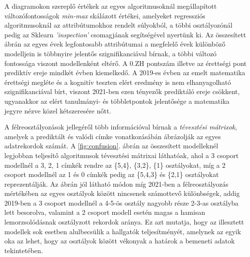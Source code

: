 \documentclass[12pt]{article}
\begin{document}
%	



\noindent A diagramokon szereplő értékek az egyes algoritmusoknál megállapított változófontosságok \textit{min-max} skálázott értékei, amelyeket regressziós algoritmusoknál az attribútumokhoz rendelt súlyokból, a többi osztályozónál pedig az Sklearn \textit{'inspection'} csomagjának segítségével nyertünk ki. Az összesített ábrán az egyes évek legfontosabb attribútumai a megfelelő évek különböző modelljein is többnyire jelentős szignifikanciával bírnak, a többi változó fontossága viszont modellenként eltérő. A 0.ZH pontszám illetve az érettségi pont prediktív ereje mindkét évben kiemelkedő. A 2019-es évben az emelt matematika érettségi megléte és a kognitív teszten elért eredmény is nem elhanyagolható szignifikanciával bírt, viszont 2021-ben ezen tényezők prediktáló ereje csökkent, ugyanakkor az elért tanulmányi- és többletpontok jelentősége a matematika jegyre nézve közel kétszeresére nőtt.

A félreosztályozások jellegéről több információval bírnak a \emph{tévesztési mátrixok}, amelyek a prediktált és valódi címke vonatkozásábán ábrázolják az egyes adatrekordok számát. A \ref{fig:confusion}. ábrán az összesített modelleknél legjobban teljesítő algoritmusok tévesztési mátrixai láthatóak, ahol a 3 csoport modellnél a 3, 2, 1 címkék rendre az \{5,4\}, \{3,2\}, \{1\} osztályokat, míg a 2 csoport modellnél az 1 és 0 címkék pedig az \{5,4,3\} és \{2,1\} osztályokat reprezentálják. Az ábrán jól látható módon míg 2021-ben a félreosztályozás mértékében az egyes osztályok között nincsenek számottevő különbségek, addig 2019-ben a 3 csoport modellnél a 4-5-ös osztály nagyobb része 2-3-as osztályba lett besorolva, valamint a 2 csoport modell esetén magas a hamisan lemorzsolódásnak osztályzott rekordok aránya. Ez azt mutatja, hogy az illesztett modellek sok esetben alulbecsülik a hallgatók teljesítményét, amelynek az egyik oka az lehet, hogy az osztályok között vékonyak a határok a bemeneti adatok tekintetében.
\end{document}
